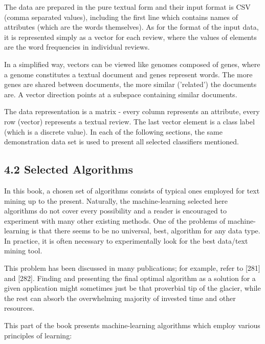 \documentclass[10pt]{book}
\begin{document}
The data are prepared in the pure textual form and their input format is CSV (comma separated values), including the first line which contains names of attributes (which are the words themselves). As for the format of the input data, it is represented simply as a vector for each review, where the values of elements are the word frequencies in individual reviews.

In a simplified way, vectors can be viewed like genomes composed of genes, where a genome constitutes a textual document and genes represent words. The more genes are shared between documents, the more similar ('related') the documents are. A vector direction points at a subspace containing similar documents.

The data representation is a matrix - every column represents an attribute, every row (vector) represents a textual review. The last vector element is a class label (which is a discrete value). In each of the following sections, the same demonstration data set is used to present all selected classifiers mentioned.

\subsection*{4.2 Selected Algorithms}
In this book, a chosen set of algorithms consists of typical ones employed for text mining up to the present. Naturally, the machine-learning selected here algorithms do not cover every possibility and a reader is encouraged to experiment with many other existing methods. One of the problems of machine-learning is that there seems to be no universal, best, algorithm for any data type. In practice, it is often necessary to experimentally look for the best data/text mining tool.

This problem has been discussed in many publications; for example, refer to [281] and [282]. Finding and presenting the final optimal algorithm as a solution for a given application might sometimes just be that proverbial tip of the glacier, while the rest can absorb the overwhelming majority of invested time and other resources.

This part of the book presents machine-learning algorithms which employ various principles of learning:
\end{document}
